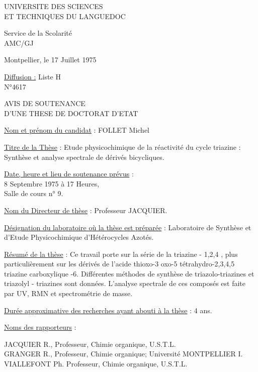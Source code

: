 UNIVERSITE DES SCIENCES\\
ET TECHNIQUES DU LANGUEDOC


Service de la Scolarité\\
AMC/GJ

Montpellier, le 17 Juillet 1975

\uline{Diffusion :} Liste H\\
N°4617

AVIS DE SOUTENANCE\\
D'UNE THESE DE DOCTORAT D'ETAT


\uline{Nom et prénom du candidat} : FOLLET Michel

\uline{Titre de la Thèse} : Etude physicochimique de la réactivité du cycle triazine : Synthèse et analyse spectrale de dérivés bicycliques.

\uline{Date, heure et lieu de soutenance prévus} :\\
8 Septembre 1975 à 17 Heures,\\
Salle de cours n° 9.

\uline{Nom du Directeur de thèse} : Professeur JACQUIER.

\uline{Désignation du laboratoire où la thèse est préparée} : Laboratoire de Synthèse et d'Etude Physicochimique d'Hétérocycles Azotés.

\uline{Résumé de la thèse} : Ce travail porte sur la série de la triazine - 1,2,4 , plus particulièrement sur les dérivés de l'acide thioxo-3 oxo-5 tétrahydro-2,3,4,5 triazine carboxylique -6. Différentes méthodes de synthèse de triazolo-triazines et triazolyl - triazines sont données. L'analyse spectrale de ces composés est faite par UV, RMN et spectrométrie de masse.

\uline{Durée approximative des recherches ayant abouti à la thèse} : 4 ans.

\uline{Noms des rapporteurs} :

JACQUIER R., Professeur, Chimie organique, U.S.T.L.\\
GRANGER R., Professeur, Chimie organique; Université MONTPELLIER I.\\
VIALLEFONT Ph. Professeur, Chimie organique, U.S.T.L.

